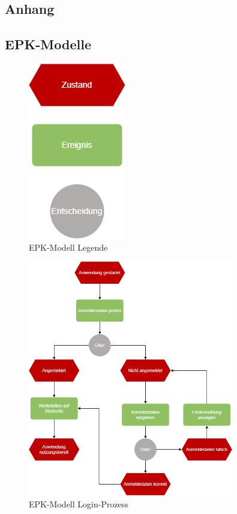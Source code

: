 \begin{appendix}
  \section{Anhang}\label{sec:anhang}

  \subsection{EPK-Modelle}\label{subsec:epk-modelle}

  \begin{figure}[ht]
        \centering
        \includegraphics[]{images/ReQ_EPK_Legende}
        \caption{EPK-Modell Legende}
        \label{fig:epk_legende}
    \end{figure}

    \begin{figure}[ht]
        \centering
        \includegraphics[width=0.8\textwidth]{images/ReQ_Login_EPK}
        \caption{EPK-Modell Login-Prozess}
        \label{fig:epk_login}
    \end{figure}


\end{appendix}
